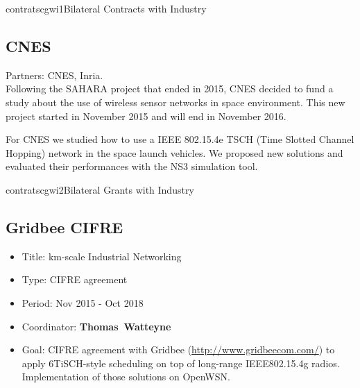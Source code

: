 \documentclass{ra2016}
\newcommand{\thomas}           {\textbf{Thomas~Watteyne}}
\begin{document}
\begin{module}{contrats}{cgwi1}{Bilateral Contracts with Industry}

\subsection{CNES}

\begin{participants}
\end{participants}

Partners: CNES, Inria.\\

Following the SAHARA project that ended in 2015, CNES decided to fund a study about the use of wireless sensor networks in space environment.
This new project started in November 2015 and will end in November 2016.

For CNES we studied how to use a IEEE 802.15.4e TSCH (Time Slotted Channel Hopping) network in the space launch vehicles. We proposed new solutions and evaluated their performances with the NS3 simulation tool.\\

\end{module}



\begin{module}{contrats}{cgwi2}{Bilateral Grants with Industry}

\subsection{Gridbee CIFRE}

\begin{participants}
\end{participants}

\begin{itemize}
    \item Title: km-scale Industrial Networking
    \item Type: CIFRE agreement
    \item Period: Nov 2015 - Oct 2018
    \item Coordinator: \thomas
    \item Goal: CIFRE agreement with Gridbee (\url{http://www.gridbeecom.com/}) to apply 6TiSCH-style scheduling on top of long-range IEEE802.15.4g radios. Implementation of those solutions on OpenWSN.
\end{itemize}



\end{module}
\end{document}
